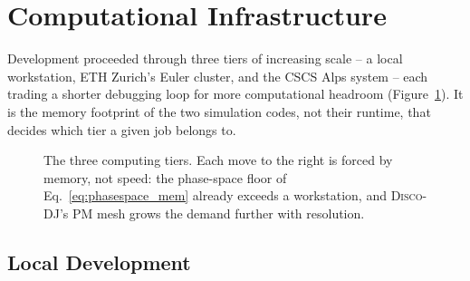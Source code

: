 \documentclass{report}
\begin{document}
\clearpage
\section{Computational Infrastructure}
\label{sec:infrastructure}

Development proceeded through three tiers of increasing scale -- a local workstation, ETH Zurich's Euler cluster, and the CSCS Alps system -- each trading a shorter debugging loop for more computational headroom (Figure~\ref{fig:infra_tiers}). It is the memory footprint of the two simulation codes, not their runtime, that decides which tier a given job belongs to.

\begin{figure}[h!]
\centering
{}
\caption{The three computing tiers. Each move to the right is forced by memory, not speed: the phase-space floor of Eq.~\eqref{eq:phasespace_mem} already exceeds a workstation, and \textsc{Disco-DJ}'s PM mesh grows the demand further with resolution.}
\label{fig:infra_tiers}
\end{figure}

\subsection{Local Development}
\label{sec:local_dev}
\end{document}
